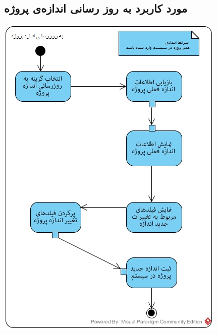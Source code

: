 \subsection*{مورد کاربرد به روز رسانی اندازه‌ی پروژه}
\vspace{2cm}
\begin{center}
\includegraphics[width=\textwidth]{ActivityDiagrams/26.jpg}
\end{center}

\newpage
\vspace{2cm}
